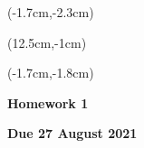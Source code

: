 \documentclass[12pt, oneside]{article}
\begin{document}
\begin{textblock*}{4cm}(-1.7cm,-2.3cm)
\end{textblock*}

\begin{textblock*}{8cm}(12.5cm,-1cm)
\end{textblock*}
\begin{textblock*}{13.5cm}(-1.7cm,-1.8cm)
\end{textblock*}

\vspace{1cm}

\begin{center}
\textbf{\Large Homework 1}

\textbf{Due 27 August 2021}
\end{center}
\end{document}
